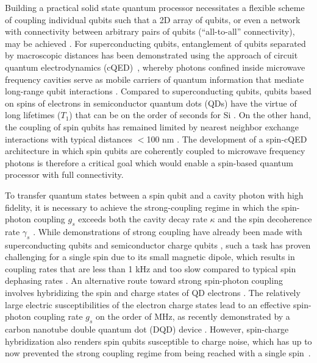 \documentclass[twocolumn,english,aps,prl,preprint,reprint,showpacs,longbibliography,showkeys]{revtex4-1}
\begin{document}
Building a practical solid state quantum processor necessitates a flexible scheme of coupling individual qubits such that a 2D array of qubits, or even a network with connectivity between arbitrary pairs of qubits (``all-to-all'' connectivity), may be achieved \cite{Fowler2012,Corcoles2015,Debnath2016}. For superconducting qubits, entanglement of qubits separated by macroscopic distances has been demonstrated using the approach of circuit quantum electrodynamics (cQED)~\cite{Raimond2001,Blais2004,Childress2004,2017arXiv170900466C}, whereby photons confined inside microwave frequency cavities serve as mobile carriers of quantum information that mediate long-range qubit interactions \cite{Majer2007,Sillanpaa2007}. Compared to superconducting qubits, qubits based on spins of electrons in semiconductor quantum dots (QDs) have the virtue of long lifetimes ($T_1$) that can be on the order of seconds for Si \cite{Yang2013,Zwanenburg2013}. On the other hand, the coupling of spin qubits has remained limited by nearest neighbor exchange interactions with typical distances $<$100 nm \cite{Petta2005,Veldhorst2015}. The development of a spin-cQED architecture
in which spin qubits are coherently coupled to microwave frequency photons is therefore a critical goal which would enable a spin-based quantum processor with full connectivity.

To transfer quantum states between a spin qubit and a cavity photon with high fidelity, it is necessary to achieve the strong-coupling regime in which the spin-photon coupling  $g_s$ exceeds both the cavity decay rate $\kappa$ and the spin decoherence rate $\gamma_s$ \cite{Raimond2001,Imamoglu2009}. While demonstrations of strong coupling have already been made with superconducting qubits \cite{Wallraff2004} and semiconductor charge qubits \cite{Mi2017b,Stockklauser2017,Bruhat2016}, such a task has proven challenging for a single spin due to its small magnetic dipole, which results in coupling rates that are less than 1 kHz and too slow compared to typical spin dephasing rates \cite{Imamoglu2009,Amsuss2011,Bienfait2016,Eichler2017}. An alternative route toward strong spin-photon coupling involves hybridizing the spin and charge states of QD electrons \cite{Childress2004,Trif2008,Cottet2010,Hu2012,Beaudoin2016}. The relatively large electric susceptibilities of the electron charge states lead to an effective spin-photon coupling rate $g_s$ on the order of MHz, as recently demonstrated by a carbon nanotube double quantum dot (DQD) device \cite{Viennot2015}. However, spin-charge hybridization also renders spin qubits susceptible to charge noise, which has up to now 
prevented the strong coupling regime from being reached with a single spin~\cite{Viennot2015}.
\end{document}
